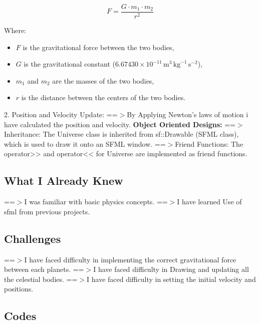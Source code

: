 \documentclass[12pt]{article}
\begin{document}
\[
F = \frac{G \cdot m_1 \cdot m_2}{r^2}
\]

Where:
\begin{itemize}
    \item \( F \) is the gravitational force between the two bodies,
    \item \( G \) is the gravitational constant (\(6.67430 \times 10^{-11} \, \text{m}^3 \, \text{kg}^{-1} \, \text{s}^{-2}\)),
    \item \( m_1 \) and \( m_2 \) are the masses of the two bodies,
    \item \( r \) is the distance between the centers of the two bodies.
\end{itemize}


2. Position and Velocity Update:
\newline
 ==$>$By Applying Newton's laws of motion i have calculated the position and velocity.
\newline
\textbf{Object Oriented Designs:}
\newline
==$>$Inheritance:
\newline
The Universe class is inherited from sf::Drawable (SFML class), which is used to draw it  onto an SFML window.
\newline
==$>$Friend Functions:
\newline
The operator>> and operator<< for Universe are implemented as friend functions.
\subsection{What I Already Knew}
==$>$I was familiar with basic physics concepts.
\newline
==$>$I have learned Use of sfml from previous projects.
\subsection{Challenges}
==$>$I have faced difficulty in implementing the correct gravitational force between each planets.
\newline
==$>$I have faced difficulty in Drawing and updating all the celestial bodies.
\newline
==$>$I have faced difficulty in setting the initial velocity and positions.

\subsection{Codes}
\end{document}
